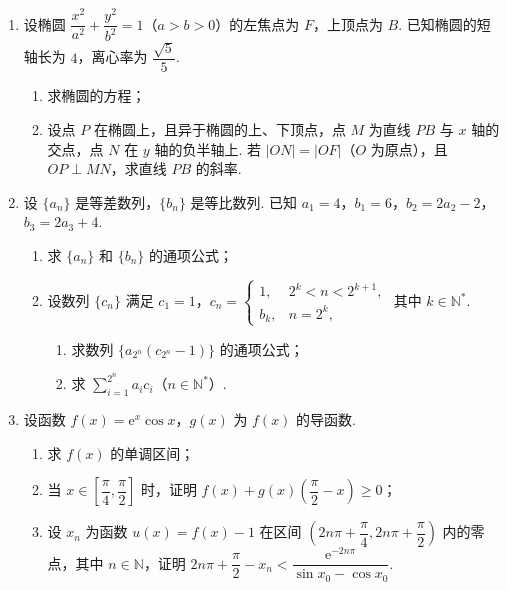 \begin{description}
\begin{enumerate}[leftmargin=5pt]
        \item 设椭圆 \( \dfrac{x^2}{a^2}+\dfrac{y^2}{b^2}=1 \)（\( a>b>0 \)）的左焦点为 \(F\)，上顶点为 \(B\). 已知椭圆的短轴长为 \( 4 \)，离心率为 \( \dfrac{\sqrt5}{5} \).

\begin{enumerate}
\item 求椭圆的方程；
\item 设点 \(P\) 在椭圆上，且异于椭圆的上、下顶点，点 \(M\) 为直线 \(PB\) 与 \( x \) 轴的交点，点 \(N\) 在 \( y \) 轴的负半轴上. 若 \( |ON|=|OF| \)（\(O\) 为原点），且 \( OP\perp MN \)，求直线 \(PB\) 的斜率.
\end{enumerate}

        \item 设 \( \{a_n\} \) 是等差数列，\( \{b_n\} \) 是等比数列. 已知 \( a_1=4 \)，\( b_1=6 \)，\( b_2=2a_2-2 \)，\( b_3=2a_3+4 \).

\begin{enumerate}
\item 求 \( \{a_n\} \) 和 \( \{b_n\} \) 的通项公式；
\item 设数列 \( \{c_n\} \) 满足 \( c_1=1 \)，\( c_n=\begin{cases}
1, & 2^k<n<2^{k+1},\\
b_k, & n=2^k,
\end{cases} \) 其中 \( k\in \mathbb{N}^* \).
\begin{enumerate}
\item 求数列 \( \{a_{2^n}(c_{2^n}-1)\} \) 的通项公式；
\item 求 \( \sum_{i=1}^{2^n} a_ic_i \)（\( n\in \mathbb{N}^* \)）.
\end{enumerate}
\end{enumerate}

        \item 设函数 \( f(x)={\mathrm{e}}^x\cos x \)，\( g(x) \) 为 \( f(x) \) 的导函数.

\begin{enumerate}
\item 求 \( f(x) \) 的单调区间；
\item 当 \( x\in \left[ \dfrac{\pi}{4},\dfrac{\pi}{2} \right] \) 时，证明 \( f(x)+g(x)\left( \dfrac{\pi}{2}-x \right)\ge 0 \)；
\item 设 \( x_n \) 为函数 \( u(x)=f(x)-1 \) 在区间 \( \left( 2n\pi+\dfrac{\pi}{4},2n\pi+\dfrac{\pi}{2} \right) \) 内的零点，其中 \( n\in \mathbb{N} \)，证明
\(2n\pi+\dfrac{\pi}{2}-x_n<\dfrac{{\mathrm{e}}^{-2n\pi}}{\sin x_0-\cos x_0}\).
\end{enumerate}

    \end{enumerate}

\end{description}


